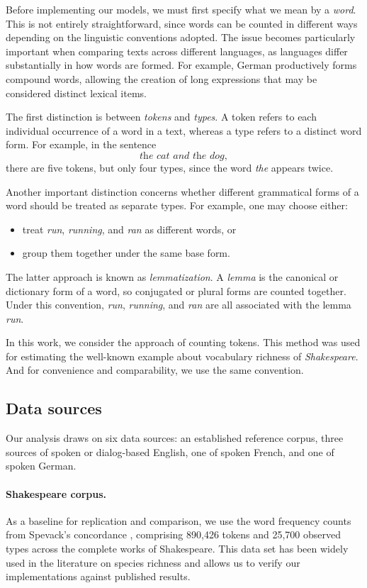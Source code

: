 ﻿\documentclass{article}
\begin{document}
Before implementing our models, we must first specify what we mean by a \emph{word}. This is not entirely straightforward, since words can be counted in different ways depending on the linguistic conventions adopted. The issue becomes particularly important when comparing texts across different languages, as languages differ substantially in how words are formed. For example, German productively forms compound words, allowing the creation of long expressions that may be considered distinct lexical items.

The first distinction is between \emph{tokens} and \emph{types}. A token refers to each individual occurrence of a word in a text, whereas a type refers to a distinct word form. For example, in the sentence
\[
\textit{the cat and the dog},
\]
there are five tokens, but only four types, since the word \textit{the} appears twice.

Another important distinction concerns whether different grammatical forms of a word should be treated as separate types. For example, one may choose either:
\begin{itemize}
    \item treat \emph{run}, \emph{running}, and \emph{ran} as different words, or
    \item group them together under the same base form.
\end{itemize}

The latter approach is known as \emph{lemmatization}. A \emph{lemma} is the canonical or dictionary form of a word, so conjugated or plural forms are counted together. Under this convention, \emph{run}, \emph{running}, and \emph{ran} are all associated with the lemma \emph{run}.

In this work, we consider the approach of counting tokens. This method was used for estimating the well-known example about vocabulary richness of \emph{Shakespeare}. And for convenience and comparability, we use the same convention.

\subsection{Data sources}
Our analysis draws on six data sources: an established reference corpus, three sources of spoken or dialog-based English, one of spoken French, and one of spoken German.

\paragraph{Shakespeare corpus.}  As a baseline for replication and comparison, we use the word frequency counts from Spevack's concordance  \cite{Spevack1968}, comprising 890,426 tokens and 25,700 observed types  across the complete works of Shakespeare. This data set has been widely used  in the literature on species richness \cite{BalabdaouiKulagina2020, CheeWang2016} and allows us to verify our  implementations against published results.
\end{document}
